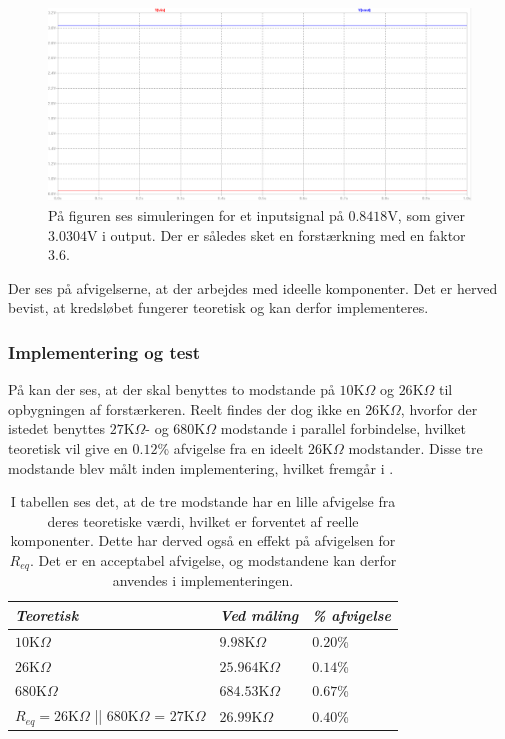 \begin{figure}[H]
	\centering
	\includegraphics[scale=0.3]{figures/cProblemloesning/Forstaerker_faktor3_simulering.PNG}
	\caption{På figuren ses simuleringen for et inputsignal på $0.8418$V, som giver $3.0304$V i output. Der er således sket en forstærkning med en faktor $3.6$.}
	\label{fig:faktor3_simulering}
\end{figure}
\noindent Der ses på afvigelserne, at der arbejdes med ideelle komponenter. Det er herved bevist, at kredsløbet fungerer teoretisk og kan derfor implementeres.

\subsubsection{Implementering og test}
På  kan der ses, at der skal benyttes to modstande på $10$K$\Omega$ og $26$K$\Omega$ til opbygningen af forstærkeren. Reelt findes der dog ikke en $26$K$\Omega$, hvorfor der istedet benyttes $27$K$\Omega$- og $680$K$\Omega$ modstande i parallel forbindelse, hvilket teoretisk vil give en $0.12$\% afvigelse fra en ideelt $26$K$\Omega$ modstander. Disse tre modstande blev målt inden implementering, hvilket fremgår i .
\begin{table}[H]
	\centering
	\begin{tabular}{|l|l|l|}
		\hline
		\textit{Teoretisk}  & \textit{Ved måling} & \textit{\% afvigelse} \\ \hline
		$10$K$\Omega$       & $9.98$K$\Omega$     & $0.20$\%               \\ \hline
		$26$K$\Omega$      &  $25.964$K$\Omega$   & $0.14$\% \\ \hline
		$680$K$\Omega$      & $684.53$K$\Omega$   & $0.67$\%               \\ \hline
$R_{eq} = 26$K$\Omega$ || $680$K$\Omega$ = $27$K$\Omega$       & $26.99$K$\Omega$    & $0.40$\%               \\ \hline
	\end{tabular}
	\caption{I tabellen ses det, at de tre modstande har en lille afvigelse fra deres teoretiske værdi, hvilket er forventet af reelle komponenter. Dette har derved også en effekt på afvigelsen for $R_{eq}$. Det er en acceptabel afvigelse, og modstandene kan derfor anvendes i implementeringen.}
	\label{Tab:modstand_faktor18}
\end{table}

